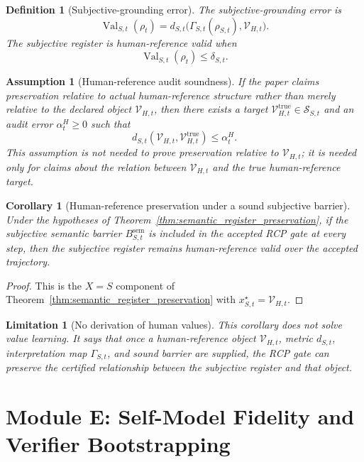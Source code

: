 \documentclass[11pt]{article}
\newtheorem{corollary}[theorem]{Corollary}
\newtheorem{definition}[theorem]{Definition}
\newtheorem{assumption}[theorem]{Assumption}
\newtheorem{limitation}[theorem]{Limitation}
\newcommand{\1}{\mathbf{1}}
\newcommand{\Val}{\operatorname{Val}}
\providecommand{\Scal}{\mathcal{S}}
\providecommand{\Vcal}{\mathcal{V}}
\providecommand{\true}{\mathrm{true}}
\providecommand{\sem}{\mathrm{sem}}
\begin{document}
\begin{definition}[Subjective-grounding error]
\label{def:subjective_grounding_error}
The subjective-grounding error is
\[
\Val_{S,t}(\rho_t)
=
d_{S,t}\bigl(\Gamma_{S,t}(\rho_{S,t}),\Vcal_{H,t}\bigr).
\]
The subjective register is human-reference valid when
\[
\Val_{S,t}(\rho_t)\le\delta_{S,t}.
\]
\end{definition}

\begin{assumption}[Human-reference audit soundness]
\label{ass:human_reference_audit_soundness}
If the paper claims preservation relative to actual human-reference structure rather than merely relative to the declared object \(\Vcal_{H,t}\), then there exists a target \(\Vcal_{H,t}^{\true}\in\Scal_{S,t}\) and an audit error \(\alpha^H_t\ge0\) such that
\[
d_{S,t}(\Vcal_{H,t},\Vcal_{H,t}^{\true})\le\alpha^H_t.
\]
This assumption is not needed to prove preservation relative to \(\Vcal_{H,t}\); it is needed only for claims about the relation between \(\Vcal_{H,t}\) and the true human-reference target.
\end{assumption}

\begin{corollary}[Human-reference preservation under a sound subjective barrier]
\label{cor:human_reference_preservation}
Under the hypotheses of Theorem~\ref{thm:semantic_register_preservation}, if the subjective semantic barrier \(B^{\sem}_{S,t}\) is included in the accepted RCP gate at every step, then the subjective register remains human-reference valid over the accepted trajectory.
\end{corollary}

\begin{proof}
This is the \(X=S\) component of Theorem~\ref{thm:semantic_register_preservation} with \(x^{\star}_{S,t}=\Vcal_{H,t}\).
\end{proof}

\begin{limitation}[No derivation of human values]
This corollary does not solve value learning.  It says that once a human-reference object \(\Vcal_{H,t}\), metric \(d_{S,t}\), interpretation map \(\Gamma_{S,t}\), and sound barrier are supplied, the RCP gate can preserve the certified relationship between the subjective register and that object.
\end{limitation}

\section{Module E: Self-Model Fidelity and Verifier Bootstrapping}
\label{sec:self_model_and_verifier_bootstrap}
\end{document}

